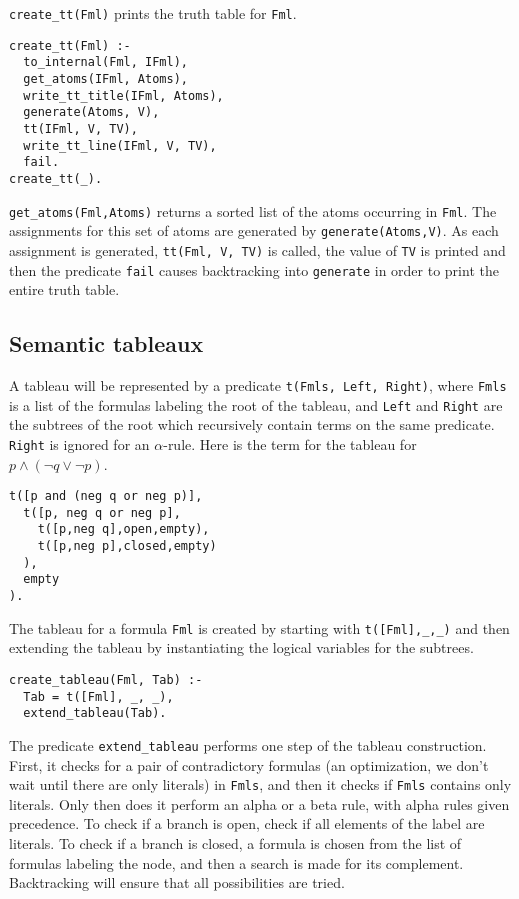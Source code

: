 \documentclass[11pt]{article}
\newcommand*{\p}[1]{\textup{\texttt{#1}}}
\begin{document}
\p{create\_tt(Fml)} prints the truth table for \p{Fml}.
\begin{verbatim}
create_tt(Fml) :-
  to_internal(Fml, IFml),
  get_atoms(IFml, Atoms),
  write_tt_title(IFml, Atoms),
  generate(Atoms, V),
  tt(IFml, V, TV),
  write_tt_line(IFml, V, TV),
  fail.
create_tt(_).
\end{verbatim}

\p{get\_atoms(Fml,Atoms)} returns a sorted list of the atoms occurring
in \p{Fml}. The assignments for this set of atoms are generated by
\p{generate(Atoms,V)}. As each assignment is generated, \p{tt(Fml, V,
TV)} is called, the value of \p{TV} is printed and then the predicate
\p{fail} causes backtracking into \p{generate} in order to print the
entire truth table.



\subsection{Semantic tableaux}\label{s.tabprop}

A tableau will be represented by a predicate \p{t(Fmls, Left, Right)},
where \p{Fmls} is a list of the formulas labeling the root of the
tableau, and \p{Left} and \p{Right} are the subtrees of the root which
recursively contain terms on the same predicate. \p{Right} is ignored
for an $\alpha$-rule. Here is the term for the tableau for $p \wedge
(\neg q \vee \neg p)$.

\begin{verbatim}
t([p and (neg q or neg p)],
  t([p, neg q or neg p],
    t([p,neg q],open,empty),
    t([p,neg p],closed,empty)
  ),
  empty
).
\end{verbatim}

The tableau for a formula \p{Fml} is created by starting with
\p{t([Fml],\_,\_)} and then extending the tableau by instantiating the
logical variables for the subtrees.

\begin{verbatim}
create_tableau(Fml, Tab) :-
  Tab = t([Fml], _, _), 
  extend_tableau(Tab).
\end{verbatim}

The predicate \p{extend\_tableau} performs one step of the tableau
construction. First, it checks for a pair of contradictory formulas (an
optimization, we don't wait until there are only literals) in \p{Fmls},
and then it checks if \p{Fmls} contains only literals. Only then does it
perform an alpha or a beta rule, with alpha rules given precedence. To
check if a branch is open, check if all elements of the label are
literals. To check if a branch is closed, a formula is chosen from the
list of formulas labeling the node, and then a search is made for its
complement. Backtracking will ensure that all possibilities are tried.
\end{document}
